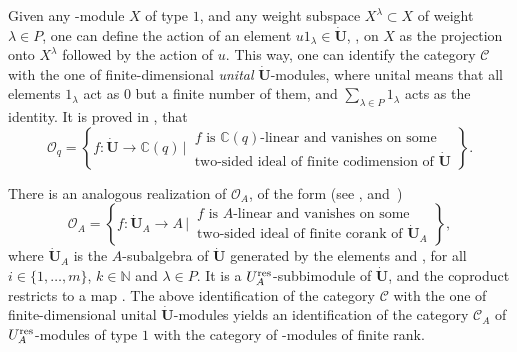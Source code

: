 \documentclass[10pt,a4paper]{amsart}
\numberwithin{equation}{section}
\theoremstyle{definition}
\newcommand{\mc}{\mathbb{C}}
\newcommand{\mn}{\mathbb{N}}
\newcommand{\Oo}{{\mathcal O}}
\newcommand{\ra}{\rightarrow}
\begin{document}
Given any -module $X$ of type $1$, and any weight subspace $X^\lambda\subset X$ of weight $\lambda\in P$, one can define the action of an element $u 1_\lambda \in \dot{\mathbf{U}}$, , on $X$ as the projection onto $X^\lambda$ followed by the action of $u$. This way, one can identify the category $\mathcal{C}$ with the one of finite-dimensional {\it unital} $\dot{\mathbf{U}}$-modules, where unital means that all elements $1_\lambda$ act as $0$ but a finite number of them, and $ \sum_{\lambda\in P} 1_\lambda$ acts as the identity. It is proved in \cite[Section~29.5.1]{Lusztig}, that
\[%
\Oo_q = \left\lbrace f\colon \dot{\mathbf{U}} \ra \mc(q) \, \bigg\vert \, \begin{matrix} \text{$f$ is $\mc(q)$-linear and vanishes on some}\\ \text{two-sided ideal of finite codimension of $\dot{\mathbf{U}}$} \end{matrix}\right\rbrace.
\]

There is an analogous realization of $\Oo_A$, of the form (see \cite[Sections~23.2 and~29.5.2]{Lusztig}, and~\cite{Lusztig3})
\[%
\Oo_A = \left\lbrace f\colon \dot{\mathbf{U}}_A \ra A \, \bigg\vert \, \begin{matrix} \text{$f$ is $A$-linear and vanishes on some}\\ \text{two-sided ideal of finite corank of $\dot{\mathbf{U}}_A$} \end{matrix}\right\rbrace ,
\]
where $\dot{\mathbf{U}}_A$ is the $A$-subalgebra of $\dot{\mathbf{U}}$ generated by the elements  and , for all $i\in \{1,\dots,m\}$, $k\in \mn$ and $\lambda \in P$. It is a $U_A^{\rm res}$-subbimodule of $\dot{\mathbf{U}}$, and the coproduct restricts to a map \smash{$\Delta \colon \dot{\mathbf{U}}_A \ra \dot{\mathbf{U}}_A {}^{\hat{\otimes}2}$}. The above identification of the category $\mathcal{C}$ with the one of finite-dimensional unital $\dot{\mathbf{U}}$-modules yields an identification of the category $\mathcal{C}_A$ of $U_A^{\rm res}$-modules of type $1$ with the category of -modules of finite rank.
\end{document}
